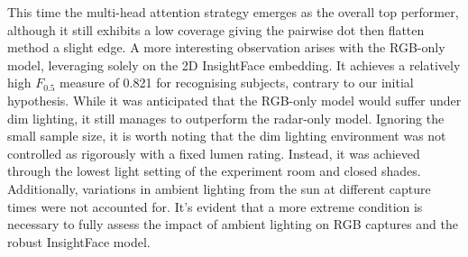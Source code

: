 \documentclass{mpaper}
\begin{document}
\begin{table}[htbp]
    \centering
    \vspace{-0.1cm}
    \vspace{0.1cm}
    \caption{Averaged accuracy and $F_{0.5}$ score for the seven fusion strategies and individual modalities against the dim lighting settings only. Equal weighting is applied to subject and liveness predictions.}
    \label{tab:dimlighting_averaged_acc_fb}
\end{table}

This time the multi-head attention strategy emerges as the overall top performer, although it still exhibits a low coverage giving the pairwise dot then flatten method a slight edge. A more interesting observation arises with the RGB-only model, leveraging solely on the 2D InsightFace embedding. It achieves a relatively high $F_{0.5}$ measure of 0.821 for recognising subjects, contrary to our initial hypothesis. While it was anticipated that the RGB-only model would suffer under dim lighting, it still manages to outperform the radar-only model. Ignoring the small sample size, it is worth noting that the dim lighting environment was not controlled as rigorously with a fixed lumen rating. Instead, it was achieved through the lowest light setting of the experiment room and closed shades. Additionally, variations in ambient lighting from the sun at different capture times were not accounted for. It's evident that a more extreme condition is necessary to fully assess the impact of ambient lighting on RGB captures and the robust InsightFace model.
\end{document}
